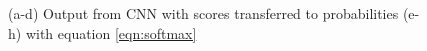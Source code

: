 \begin{figure}[H]
    \caption[Scores $\to$ probabilities]{(a-d) Output from \ac{CNN} with scores transferred to probabilities (e-h) with equation \ref{eqn:softmax}}
    \label{predictions_scores_softmax}
\end{figure}